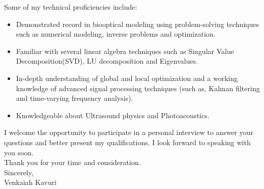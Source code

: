 \documentclass{my_cv}
\begin{document}
Some of my technical proficiencies include:\\
\begin{itemize}\itemsep -2pt
\item Demonstrated record in biooptical modeling using problem-solving techniques such as numerical modeling, inverse problems and optimization.\\
\item Familiar with several linear algebra techniques such as Singular Value Decomposition(SVD), LU decomposition and Eigenvalues.
\item In-depth understanding of global and local optimization and a working knowledge of advanced signal processing techniques (such as, Kalman filtering and time-varying frequency analysis).\\
\item Knowledgeable about Ultrasound physics and Photoacoustics.\\
\end{itemize} 


\vspace{2mm} 
I welcome the opportunity to participate in a personal interview to answer your questions and better present my qualifications. I look forward to speaking with you soon.\\
\vspace{2mm} 
Thank you for your time and consideration.\\
\vspace{10mm} 
Sincerely,\\

\vspace{5mm} 
Venkaiah Kavuri\\
\end{document}
